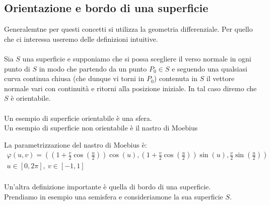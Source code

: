 \documentclass[a4paper, oneside]{article}
\begin{document}
\subsection{Orientazione e bordo di una superficie}
Generalemtne per questi concetti si utilizza la geometria differenziale. Per quello che ci interessa useremo delle definizioni intuitive.\\
\hfill\\
Sia  $S$ una superficie e supponiamo che si possa 
scegliere il verso normale in ogni punto di $S$ in modo 
che partendo da un punto $P_0 \in S$ e seguendo una qualsiasi 
curva continua chiusa (che dunque vi torni in $P_0$) 
contenuta in $S$ il vettore normale vari con continuità e ritorni alla posizione iniziale. 
In tal caso diremo che $S$ è orientabile.\\
\hfill\\
Un esempio di superficie orientabile è una sfera.\\
Un esempio di superficie non orientabile è il nastro di Moebius
\begin{center}
\end{center}
La parametrizzazione del nastro di Moebius è:
\begin{gather*}
  \varphi(u,v) = \left( \left(1 + \frac{v}{2} \cos\left(\frac{u}{2}\right)\right) \cos(u), \left(1 + \frac{v}{2} \cos\left(\frac{u}{2}\right)\right) \sin(u), \frac{v}{2} \sin\left(\frac{u}{2}\right) \right)\\
  u \in [0, 2\pi], \ v \in [-1, 1]
\end{gather*}
\hfill\\
Un'altra definizione importante è quella di bordo di una superficie.\\
Prendiamo in esempio una semisfera e consideriamone la sua superficie $S$.\\
\end{document}

